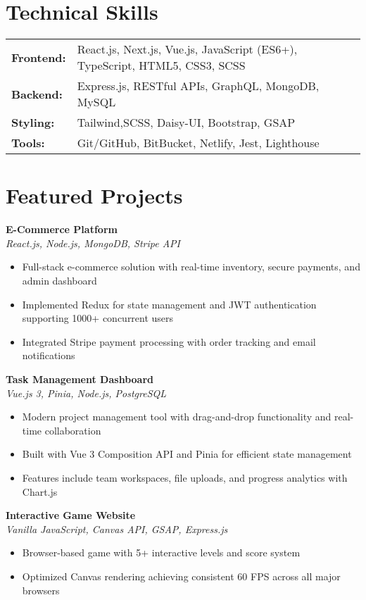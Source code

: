 \documentclass[10pt]{article}
\begin{document}
\section{Technical Skills}
\begin{tabularx}{\textwidth}{@{} l X @{}}
\textbf{Frontend:} & React.js, Next.js, Vue.js, JavaScript (ES6+), TypeScript, HTML5, CSS3, SCSS \\
\textbf{Backend:} & Express.js, RESTful APIs, GraphQL, MongoDB, MySQL \\
\textbf{Styling:} & Tailwind,SCSS, Daisy-UI, Bootstrap, GSAP \\
\textbf{Tools:} & Git/GitHub, BitBucket, Netlify, Jest, Lighthouse \\
\end{tabularx}

\section{Featured Projects}

\textbf{E-Commerce Platform} \\
\textit{React.js, Node.js, MongoDB, Stripe API}
\begin{itemize}
\item Full-stack e-commerce solution with real-time inventory, secure payments, and admin dashboard
\item Implemented Redux for state management and JWT authentication supporting 1000+ concurrent users
\item Integrated Stripe payment processing with order tracking and email notifications
\end{itemize}
\textbf{Task Management Dashboard} \\
\textit{Vue.js 3, Pinia, Node.js, PostgreSQL}
\begin{itemize}
\item Modern project management tool with drag-and-drop functionality and real-time collaboration
\item Built with Vue 3 Composition API and Pinia for efficient state management
\item Features include team workspaces, file uploads, and progress analytics with Chart.js
\end{itemize}
\textbf{Interactive Game Website} \\
\textit{Vanilla JavaScript, Canvas API, GSAP, Express.js}
\begin{itemize}
\item Browser-based game with 5+ interactive levels and score system
\item Optimized Canvas rendering achieving consistent 60 FPS across all major browsers
\end{itemize}
\end{document}
